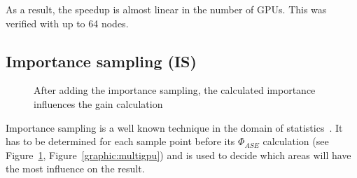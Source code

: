 As a result, the speedup is almost linear in the number of GPUs. This was
verified with up to 64 nodes.
    
\subsection{Importance sampling (IS)}
\label{subsec:importance_sampling}
\begin{figure}[H]
  \centerline
  {}
  \caption{After adding the importance sampling, the calculated importance 
  influences the gain calculation}
  \label{graphic:pap2}
\end{figure}
Importance sampling is a well known technique in the domain
of statistics~\cite{importanceSamplingSource}. It has to be determined for each
sample point before its $\Phi_{ASE}$ calculation (see Figure~\ref{graphic:pap2},
Figure~\ref{graphic:multigpu}) and is used 
to decide which areas will have the most influence on the result.

